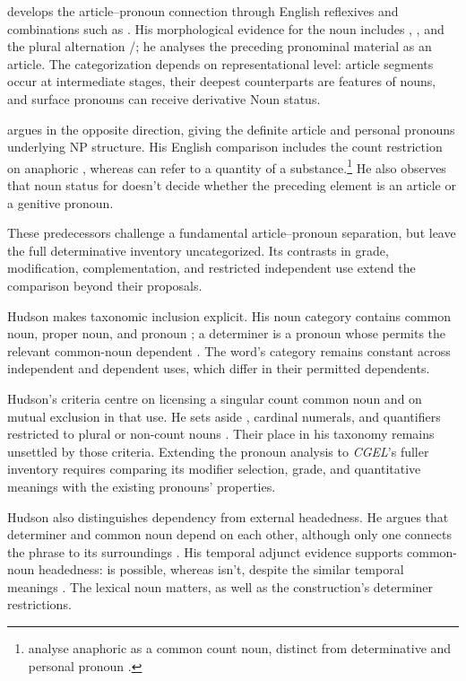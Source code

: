 \documentclass[12pt]{article}
\begin{document}
\textcite{postal1966} develops the article--pronoun connection through English reflexives and combinations such as . His morphological evidence for the noun  includes , , and the plural alternation /; he analyses the preceding pronominal material as an article. The categorization depends on representational level: article segments occur at intermediate stages, their deepest counterparts are features of nouns, and surface pronouns can receive derivative Noun status.

\textcite[197--203]{sommerstein1972} argues in the opposite direction, giving the definite article and personal pronouns underlying NP structure. His English comparison includes the count restriction on anaphoric , whereas  can refer to a quantity of a substance.\footnote{\textcite[797--798]{payne2013anaphoric} analyse anaphoric  as a common count noun, distinct from determinative  and personal pronoun .} He also observes that noun status for  doesn't decide whether the preceding element is an article or a genitive pronoun.

These predecessors challenge a fundamental article--pronoun separation, but leave the full determinative inventory uncategorized. Its contrasts in grade, modification, complementation, and restricted independent use extend the comparison beyond their proposals.

Hudson makes taxonomic inclusion explicit. His noun category contains common noun, proper noun, and pronoun \citep[253--254]{hudson2010wordgrammar}; a determiner is a pronoun whose  permits the relevant common-noun dependent \citep[9--10]{hudson2004determiners}. The word's category remains constant across independent and dependent uses, which differ in their permitted dependents.

Hudson's criteria centre on licensing a singular count common noun and on mutual exclusion in that use. He sets aside , cardinal numerals, and quantifiers restricted to plural or non-count nouns \citep[9--10]{hudson2004determiners}. Their place in his taxonomy remains unsettled by those criteria. Extending the pronoun analysis to \textit{CGEL}'s fuller inventory requires comparing its modifier selection, grade, and quantitative meanings with the existing pronouns' properties.

Hudson also distinguishes dependency from external headedness. He argues that determiner and common noun depend on each other, although only one connects the phrase to its surroundings \citep[7--8]{hudson2004determiners}. His temporal adjunct evidence supports common-noun headedness:  is possible, whereas  isn't, despite the similar temporal meanings \citep[10--12]{hudson2004determiners}. The lexical noun matters, as well as the construction's determiner restrictions.
\end{document}
